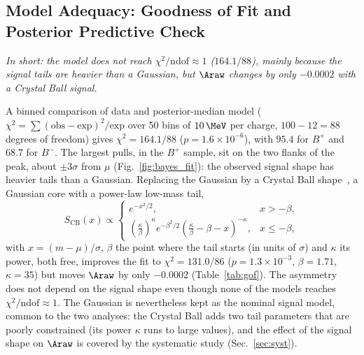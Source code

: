 \subsection{Model Adequacy: Goodness of Fit and Posterior Predictive Check}
\label{sec:bayes_gof}
\emph{In short: the model does not reach $\chi^2/\mathrm{ndof}\approx1$ ($164.1/88$), mainly because the signal tails are heavier than a Gaussian, but $\Araw$ changes by only $-0.0002$ with a Crystal Ball signal.}

A binned comparison of data and posterior-median model ($\chi^2=\sum(\text{obs}-\text{exp})^2/\text{exp}$ over 50 bins of $10\,\MeV$ per charge, $100-12=88$ degrees of freedom) gives $\chi^2=164.1/88$ ($p=1.6\times10^{-6}$), with $95.4$ for $B^+$ and $68.7$ for $B^-$. The largest pulls, in the $B^+$ sample, sit on the two flanks of the peak, about $\pm3\sigma$ from $\mu$ (Fig.~\ref{fig:bayes_fit}): the observed signal shape has heavier tails than a Gaussian. Replacing the Gaussian by a Crystal Ball shape~\cite{skwarnicki}, a Gaussian core with a power-law low-mass tail,
\begin{equation}
S_{\mathrm{CB}}(x)\propto
\begin{cases}
e^{-x^2/2}, & x>-\beta,\\[2pt]
\left(\frac{\kappa}{\beta}\right)^{\kappa} e^{-\beta^2/2}\left(\frac{\kappa}{\beta}-\beta-x\right)^{-\kappa}, & x\leq-\beta,
\end{cases}
\label{eq:cb}
\end{equation}
with $x=(m-\mu)/\sigma$, $\beta$ the point where the tail starts (in units of $\sigma$) and $\kappa$ its power, both free, improves the fit to $\chi^2=131.0/86$ ($p=1.3\times10^{-3}$, $\beta=1.71$, $\kappa=35$) but moves $\Araw$ by only $-0.0002$ (Table~\ref{tab:gof}). The asymmetry does not depend on the signal shape even though none of the models reaches $\chi^2/\text{ndof}\approx1$. The Gaussian is nevertheless kept as the nominal signal model, common to the two analyses: the Crystal Ball adds two tail parameters that are poorly constrained (its power $\kappa$ runs to large values), and the effect of the signal shape on $\Araw$ is covered by the systematic study (Sec.~\ref{sec:syst}).

